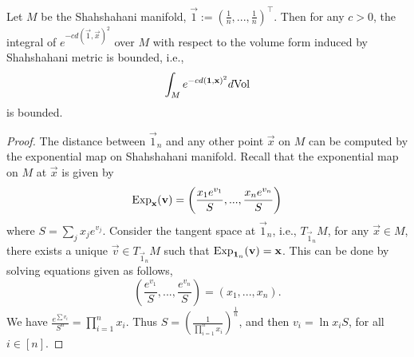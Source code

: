 \begin{lemma}\label{lemma:distance}
Let $M$ be the Shahshahani manifold, $\vec{1}:=(\frac{1}{n},...,\frac{1}{n})^{\top}$. Then for any $c>0$, the integral of $e^{-cd(\vec{1},\vec{x})^2}$ over $M$ with respect to the volume form induced by Shahshahani metric is bounded, i.e.,
\[
\int_Me^{-cd(\mathbf{1},\mathbf{x})^2}d\mathrm{Vol}
\]
is bounded.
\end{lemma}

\begin{proof}
The distance between $\vec{1}_n$ and any other point $\vec{x}$ on $M$ can be computed by the exponential map on Shahshahani manifold. Recall that the exponential map on $M$ at $\vec{x}$ is given by
\[
\mathrm{Exp}_{\mathbf{x}}(\mathbf{v})=\left(\frac{x_1e^{v_1}}{S},...,\frac{x_ne^{v_n}}{S}\right)
\]
where $S=\sum_jx_je^{v_j}$. Consider the tangent space at $\vec{1}_n$, i.e., $T_{\vec{1}_n}M$, for any $\vec{x}\in M$, there exists a unique $\vec{v}\in T_{\vec{1}_n}M$ such that $\mathrm{Exp}_{\mathbf{1}_n}(\mathbf{v})=\mathbf{x}$. This can be done by solving equations given as follows, 
\[
\left(\frac{e^{v_1}}{S},...,\frac{e^{v_n}}{S}\right)=(x_1,...,x_n).
\]
We have $\frac{e^{\sum v_i}}{S^n}=\prod_{i=1}^n x_i$. Thus $S=\left(\frac{1}{\prod_{i=1}^nx_i}\right)^{\frac{1}{n}}$, and then
$
v_i=\ln x_iS$, for all $i\in[n]$. 


\end{proof}
